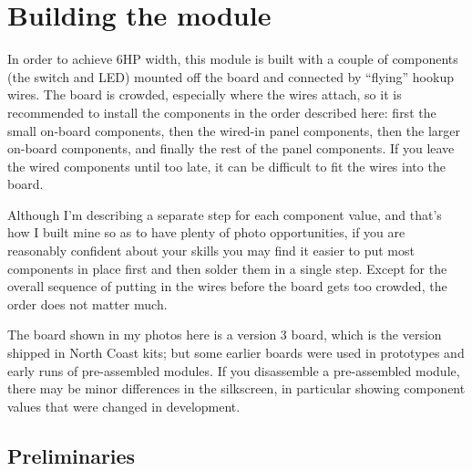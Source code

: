 
%
%
%
%
%
%

\chapter{Building the module}

In order to achieve 6HP width, this module is built with a couple of
components (the switch and LED) mounted off the board and connected by
``flying'' hookup wires.  The board is crowded, especially where
the wires attach, so it is recommended to install the
components in the order described here:  first the small on-board
components, then the wired-in panel components, then the larger on-board
components, and finally the rest of the panel components.  If you leave the
wired components until too late, it can be difficult to fit the wires into
the board.

Although I'm describing a separate step for each component value, and that's
how I built mine so as to have plenty of photo opportunities, if you are
reasonably confident about your skills you may find it easier to put most
components in place first and then solder them in a single step.  Except for
the overall sequence of putting in the wires before the board gets too
crowded, the order does not matter much.

The board shown in my photos here is a version 3 board, which is
the version shipped in North Coast kits; but some earlier boards
were used in prototypes and early runs of pre-assembled modules.  If you
disassemble a pre-assembled module, there may be minor
differences in the silkscreen, in particular showing component values that
were changed in development.

\section{Preliminaries}

